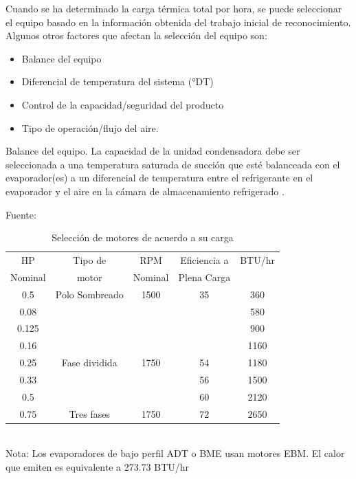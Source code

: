  Cuando se ha determinado la carga térmica total por hora, se puede seleccionar el equipo basado en la información obtenida del trabajo inicial de reconocimiento. Algunos otros factores que afectan la selección del equipo son:\vspace*{-0.2cm}
 \begin{itemize}
 	\item Balance del equipo\vspace*{-0.2cm}
 	\item Diferencial de temperatura del sistema (°DT)\vspace*{-0.2cm}
 	\item Control de la capacidad/seguridad del producto\vspace*{-0.2cm}
 	\item Tipo de operación/flujo del aire.
 \end{itemize}\vspace*{-0.2cm}
 Balance del equipo. La capacidad de la unidad condensadora debe ser seleccionada a una temperatura saturada de succión que esté balanceada con el evaporador(es) a un diferencial de temperatura entre el refrigerante en el evaporador y el aire en la cámara de almacenamiento refrigerado   \cite{intarcon-2023}.
  \begin{table}[H]
 	\centering
 	\caption{Selección de motores de acuerdo a su carga} Fuente: \cite{suarez-2022}\\
 	\begin{tabular}{ccccc}
 		\hline
 		HP      & Tipo de        & RPM     & Eficiencia a                    & BTU/hr \\
 		Nominal & motor          & Nominal & \multicolumn{1}{r}{Plena Carga} &        \\ \hline
 		0.5     & Polo Sombreado & 1500    & 35                              & 360    \\
 		0.08    &                &         &                                 & 580    \\
 		0.125   &                &         &                                 & 900    \\
 		0.16    &                &         &                                 & 1160   \\
 		0.25    & Fase dividida  & 1750    & 54                              & 1180   \\
 		0.33    &                &         & 56                              & 1500   \\
 		0.5     &                &         & 60                              & 2120   \\
 		0.75    & Tres fases     & 1750    & 72                              & 2650   \\ \hline
 	\end{tabular}\\
 	\label{tabla:motores}
 	Nota: Los evaporadores de bajo perfil ADT o BME usan motores EBM. El calor que emiten es equivalente a 273.73 BTU/hr
 \end{table}
